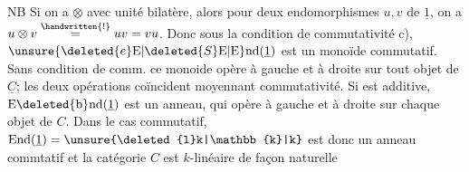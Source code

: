  NB Si on a $\otimes$ avec unité bilatère, alors pour deux endomorphismes $u,v$ de $\underline{1}$, on a $u\otimes v\overset{\handwritten{!}}{=}uv=vu$. Donc sous la condition de commutativité c), $\unsure{\deleted{e}\mathrm{E}|\deleted{S}\mathrm{E}|\mathrm{E}}\mathrm{nd}(\underline{1})$ est un monoïde commutatif.  Sans condition de comm. ce monoide opère à gauche et à droite sur tout objet de $\underline{C}$; les deux opérations coïncident moyennant commutativité. Si  est additive, $\mathrm{E}\deleted{\mathrm{b}}\mathrm{nd}(\underline{1})$ est un anneau, qui opère à gauche et à droite sur chaque objet de $C$. Dans le cas commutatif, $\mathrm{End}(\underline{1})=\unsure{\deleted{l}k|\mathbb{k}|k}$ est donc un anneau commtatif et la catégorie $C$ est $k$-linéaire de façon naturelle
